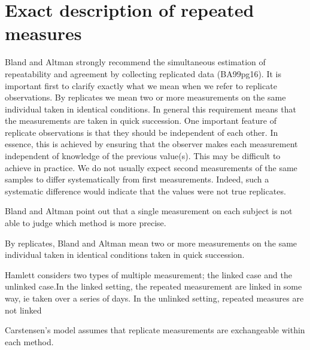\documentclass[Chap2dmain.tex]{subfiles}
\begin{document}
\newpage

\section{Exact description of repeated measures}
Bland and Altman strongly recommend the simultaneous estimation of repeatability and agreement by collecting replicated data (BA99pg16).
It is important first to clarify exactly what we mean when we refer to replicate observations. By replicates we mean two or more measurements on the same individual taken in identical conditions. In general this requirement means that the measurements are taken in quick succession.
One important feature of replicate observations is that they should be independent of each other. In essence, this is achieved by ensuring that the observer makes each measurement independent of knowledge of the previous value(s). This may be difficult to achieve in practice.
We do not usually expect second measurements of the same samples to differ systematically from first measurements. Indeed, such a systematic difference would indicate that the values were not true replicates.


Bland and Altman point out that a single measurement on each subject is not able to judge which method is more precise.

By replicates, Bland and Altman mean two or more measurements on the same individual taken in identical conditions taken in quick succession.


Hamlett considers two types of multiple measurement; the linked case and the unlinked case.In the linked setting, the repeated measurement are linked in some way, ie taken over a series of days. In the unlinked setting, repeated measures are not linked

Carstensen's model assumes that replicate measurements are exchangeable within each method.
\end{document}
